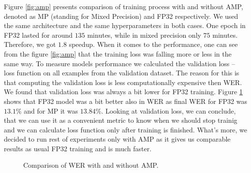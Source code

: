 \documentclass[licencjacka,en]{pracamgr}
\begin{document}
	Figure \ref{fig:amp} presents comparison of training process with and without AMP, denoted as MP (standing for Mixed Precision) and FP32 respectively. We used the same architecture and the same hyperparameters in both cases. One epoch in FP32 lasted for around $135$ minutes, while in mixed precision only $75$ minutes. Therefore, we got $1.8$ speedup. When it comes to the performance, one can see from the figure \ref{fig:amp} that the training loss was falling more or less in the same way. To measure models performance we calculated the validation loss -- loss function on all examples from the validation dataset. The reason for this is that computing the validation loss is less computationally expensive then WER. We found that validation loss was always a bit lower for FP32 training. Figure \ref{fig:wer} shows that FP32 model was a bit better also in WER as final WER for FP32 was $13.1$\% and for MP it was $13.84$\%. Looking at validation loss, we can conclude, that we can use it as a convenient metric to know when we should stop trainig and we can calculate loss function only after training is finished. What's more, we decided to run rest of experiments only with AMP as it gives us comparable results as usual FP32 training and is much faster.
	
	
	\wercomp
	
	\begin{figure}[!hbt]
		\begin{center}
		\end{center}
		\caption{Comparison of WER with and without AMP.}
		\label{fig:wer}
	\end{figure}
	
\end{document}
